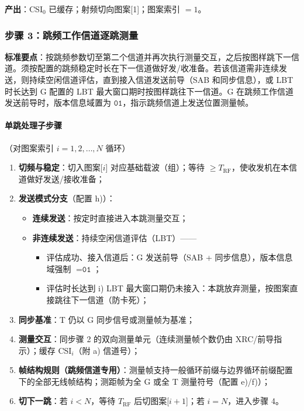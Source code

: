 \documentclass[11pt,a4paper]{ctexart}
\begin{document}
\textbf{产出}：CSI$_0$ 已缓存；射频切向图案[1]；图案索引 $=1$。

\subsubsection*{步骤 3：跳频工作信道逐跳测量}

\textbf{标准要点}：按跳频参数切至第二个信道并再次执行测量交互，之后按图样跳下一信道。须按配置的跳频稳定时长在下一信道做好发/收准备。若该信道需非连续发送，则持续空闲信道评估，直到接入信道发送前导（SAB 和同步信息），或 LBT 时长达到 G 配置的 LBT 最大窗口期时按图样跳往下一信道。G 在跳频工作信道发送前导时，版本信息域置为 $\texttt{01}$，指示跳频信道上发送位置测量帧。

\paragraph{单跳处理子步骤}（对图案索引 $i=1,2,\ldots,N$ 循环）
\begin{enumerate}[leftmargin=2em,nosep]
  \item \textbf{切频与稳定}：切入图案[$i$] 对应基础载波（组）；等待 $\ge T_{\mathrm{RF}}$，使收发机在本信道做好发送/接收准备；
  \item \textbf{发送模式分支}（配置 h)）：
  \begin{itemize}[nosep]
    \item \textbf{连续发送}：按定时直接进入本跳测量交互；
    \item \textbf{非连续发送}：持续空闲信道评估（LBT）——
      \begin{itemize}[nosep]
        \item 评估成功、接入信道后：G 发送前导（SAB + 同步信息），版本信息域强制 $=\texttt{01}$；
        \item 评估时长达到 i) LBT 最大窗口期仍未接入：本跳放弃测量，按图案直接跳往下一信道（防卡死）；
      \end{itemize}
  \end{itemize}
  \item \textbf{同步基准}：T 仍以 G 同步信号或测量帧为基准；
  \item \textbf{测量交互}：同步骤 2 的双向测量单元（连续测量帧个数仍由 XRC/前导指示）；缓存 CSI$_i$（附 a) 信道号）；
  \item \textbf{帧结构规则（跳频信道专用）}：测量帧支持一般循环前缀与边界循环前缀配置下的全部无线帧结构；测距帧为全 G 或全 T 测量符号（配置 e)/f)）；
  \item \textbf{切下一跳}：若 $i<N$，等待 $T_{\mathrm{RF}}$ 后切图案[$i{+}1$]；若 $i=N$，进入步骤 4。
\end{enumerate}
\end{document}
